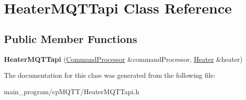 \hypertarget{class_heater_m_q_t_tapi}{}\section{Heater\+M\+Q\+T\+Tapi Class Reference}
\label{class_heater_m_q_t_tapi}
\subsection*{Public Member Functions}
\begin{DoxyCompactItemize}
\item 
{\bfseries Heater\+M\+Q\+T\+Tapi} (\hyperlink{class_command_processor}{Command\+Processor} \&command\+Processor, \hyperlink{class_heater}{Heater} \&heater)\hypertarget{class_heater_m_q_t_tapi_a86525b23a6bf8c4a8a407ae5bd4be3b4}{}\label{class_heater_m_q_t_tapi_a86525b23a6bf8c4a8a407ae5bd4be3b4}

\end{DoxyCompactItemize}


The documentation for this class was generated from the following file\+:\begin{DoxyCompactItemize}
\item 
main\+\_\+program/cp\+M\+Q\+T\+T/Heater\+M\+Q\+T\+Tapi.\+h\end{DoxyCompactItemize}

